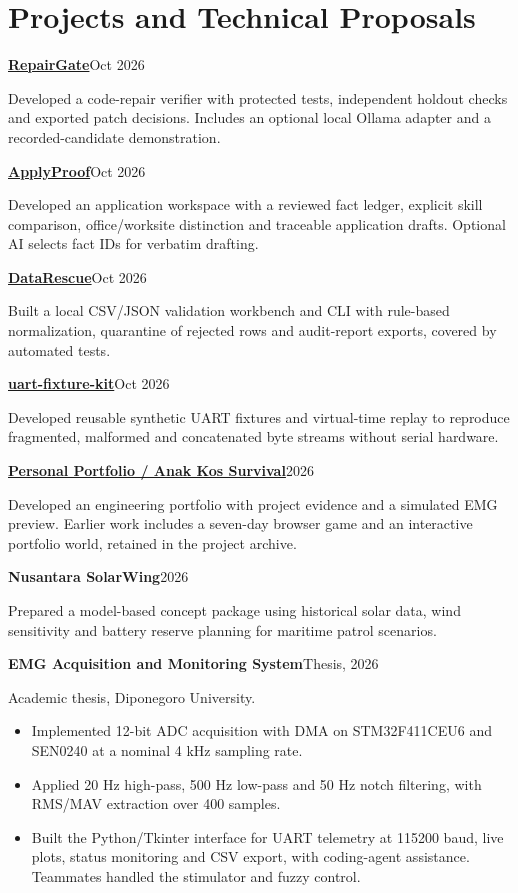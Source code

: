 \documentclass[11pt,a4paper]{article}
\newcommand{\cventry}[6]{%
  \Needspace{4\baselineskip}%
  \textbf{#3}\hfill #1\par
  \textit{#2}\ifstrempty{#4}{}{\hfill #4}\par
  #6\par\vspace{4pt}}
\begin{document}
\newpage
\section{Projects and Technical Proposals}
\renewcommand{\cventry}[6]{%
  \Needspace{3\baselineskip}%
  \textbf{#3}\hfill #1\par
  #6\par\vspace{5pt}}
\cventry{Oct 2026}{Code-repair Verification Tool}{\href{https://github.com/vanovri/repairgate}{RepairGate}}{}{}{
Developed a code-repair verifier with protected tests, independent holdout checks and exported patch decisions.
Includes an optional local Ollama adapter and a recorded-candidate demonstration.}
\cventry{Oct 2026}{Evidence-based Application Workspace}{\href{https://github.com/vanovri/applyproof}{ApplyProof}}{}{}{
Developed an application workspace with a reviewed fact ledger, explicit skill comparison, office/worksite distinction
and traceable application drafts. Optional AI selects fact IDs for verbatim drafting.}
\cventry{Oct 2026}{Structured Data Repair Tool}{\href{https://github.com/vanovri/datarescue}{DataRescue}}{}{}{
Built a local CSV/JSON validation workbench and CLI with rule-based normalization, quarantine of rejected rows and audit-report exports, covered by automated tests.}
\cventry{Oct 2026}{Serial Parser Test Toolkit}{\href{https://github.com/vanovri/uart-fixture-kit}{uart-fixture-kit}}{}{}{
Developed reusable synthetic UART fixtures and virtual-time replay to reproduce fragmented,
malformed and concatenated byte streams without serial hardware.}
\cventry{2026}{Engineering Portfolio and Browser Game}{\href{https://ardhyanovri.my.id}{Personal Portfolio / Anak Kos Survival}}{}{}{
Developed an engineering portfolio with project evidence and a simulated EMG preview.
Earlier work includes a seven-day browser game and an interactive portfolio world, retained in the project archive.}
\cventry{2026}{Solar UAV Concept and Interactive Demonstration}{Nusantara SolarWing}{}{}{
Prepared a model-based concept package using historical solar data, wind sensitivity
and battery reserve planning for maritime patrol scenarios.}
\cventry{Thesis, 2026}{Academic Thesis}{EMG Acquisition and Monitoring System}{}{}{
Academic thesis, Diponegoro University.
\begin{itemize}
\item Implemented 12-bit ADC acquisition with DMA on STM32F411CEU6 and SEN0240 at a nominal 4 kHz sampling rate.
\item Applied 20 Hz high-pass, 500 Hz low-pass and 50 Hz notch filtering, with RMS/MAV extraction over 400 samples.
\item Built the Python/Tkinter interface for UART telemetry at 115200 baud, live plots, status monitoring and CSV export, with coding-agent assistance. Teammates handled the stimulator and fuzzy control.
\end{itemize}}
\end{document}
